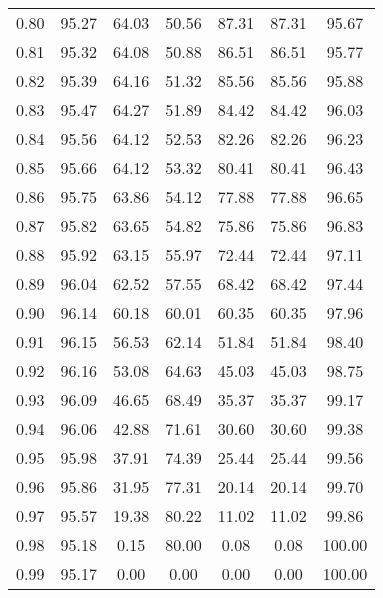 \begin{tabular}{|c|c|c|c|c|c|c|}
      0.80 &     95.27 &     64.03 &      50.56 &   87.31 &      87.31 &         95.67 \\
      0.81 &     95.32 &     64.08 &      50.88 &   86.51 &      86.51 &         95.77 \\
      0.82 &     95.39 &     64.16 &      51.32 &   85.56 &      85.56 &         95.88 \\
      0.83 &     95.47 &     64.27 &      51.89 &   84.42 &      84.42 &         96.03 \\
      0.84 &     95.56 &     64.12 &      52.53 &   82.26 &      82.26 &         96.23 \\
      0.85 &     95.66 &     64.12 &      53.32 &   80.41 &      80.41 &         96.43 \\
      0.86 &     95.75 &     63.86 &      54.12 &   77.88 &      77.88 &         96.65 \\
      0.87 &     95.82 &     63.65 &      54.82 &   75.86 &      75.86 &         96.83 \\
      0.88 &     95.92 &     63.15 &      55.97 &   72.44 &      72.44 &         97.11 \\
      0.89 &     96.04 &     62.52 &      57.55 &   68.42 &      68.42 &         97.44 \\
      0.90 &     96.14 &     60.18 &      60.01 &   60.35 &      60.35 &         97.96 \\
      0.91 &     96.15 &     56.53 &      62.14 &   51.84 &      51.84 &         98.40 \\
      0.92 &     96.16 &     53.08 &      64.63 &   45.03 &      45.03 &         98.75 \\
      0.93 &     96.09 &     46.65 &      68.49 &   35.37 &      35.37 &         99.17 \\
      0.94 &     96.06 &     42.88 &      71.61 &   30.60 &      30.60 &         99.38 \\
      0.95 &     95.98 &     37.91 &      74.39 &   25.44 &      25.44 &         99.56 \\
      0.96 &     95.86 &     31.95 &      77.31 &   20.14 &      20.14 &         99.70 \\
      0.97 &     95.57 &     19.38 &      80.22 &   11.02 &      11.02 &         99.86 \\
      0.98 &     95.18 &      0.15 &      80.00 &    0.08 &       0.08 &        100.00 \\
      0.99 &     95.17 &      0.00 &       0.00 &    0.00 &       0.00 &        100.00 \\
\bottomrule
\end{tabular}

